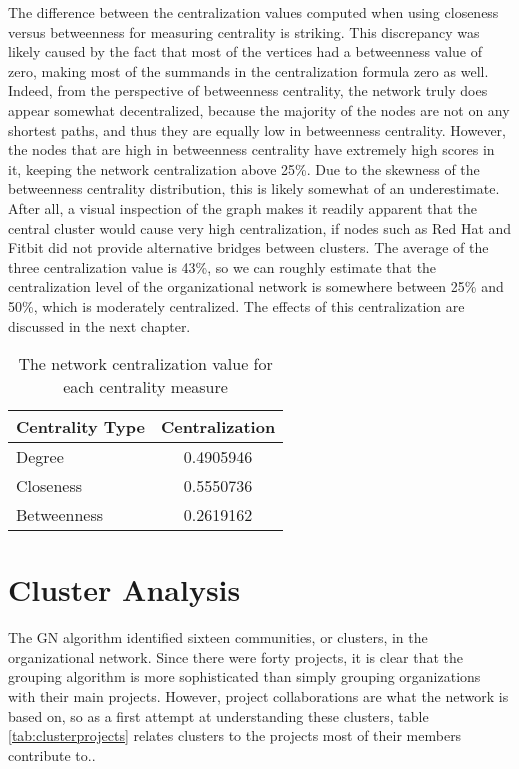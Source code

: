 The difference between the centralization values computed when using closeness versus betweenness for measuring centrality is striking. This discrepancy was likely caused by the fact that most of the vertices had a betweenness value of zero, making most of the summands in the centralization formula zero as well. Indeed, from the perspective of betweenness centrality, the network truly does appear somewhat decentralized, because the majority of the nodes are not on any shortest paths, and thus they are equally low in betweenness centrality. However, the nodes that are high in betweenness centrality have extremely high scores in it, keeping the network centralization above 25\%. Due to the skewness of the betweenness centrality distribution, this is likely somewhat of an underestimate. After all, a visual inspection of the graph makes it readily apparent that the central cluster would cause very high centralization, if nodes such as Red Hat and Fitbit did not provide alternative bridges between clusters. The average of the three centralization value is 43\%, so we can roughly estimate that the centralization level of the organizational network is somewhere between 25\% and 50\%, which is moderately centralized. The effects of this centralization are discussed in the next chapter.

\begin{table}
	\begin{tabular}{l|c}
		\bfseries Centrality Type & \bfseries Centralization \\
		\hline
		Degree & 0.4905946 \\
		\hline
		Closeness & 0.5550736 \\
		\hline
		Betweenness & 0.2619162
	\end{tabular}
	\centering
	\caption{The network centralization value for each centrality measure}\label{tab:centralization}
\end{table}

\section{Cluster Analysis}\label{clustersection}
The GN algorithm identified sixteen communities, or clusters, in the organizational network. Since there were forty projects, it is clear that the grouping algorithm is more sophisticated than simply grouping organizations with their main projects.
  However, project collaborations are what the network is based on, so as a first attempt at understanding these clusters, table \ref{tab:clusterprojects} relates clusters to the projects most of their members contribute to..

